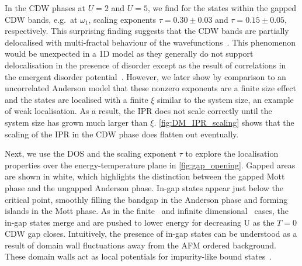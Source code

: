 In the CDW phases at \(U=2\) and \(U=5\), we find for the states within the gapped CDW bands, e.g.~at \(\omega_1\), scaling exponents \(\tau = 0.30\pm0.03\) and \(\tau = 0.15\pm0.05\), respectively. This surprising finding suggests that the CDW bands are partially delocalised with multi-fractal behaviour of the wavefunctions~\autocite{eversAndersonTransitions2008}. This phenomenon would be unexpected in a 1D model as they generally do not support delocalisation in the presence of disorder except as the result of correlations in the emergent disorder potential~\autocite{croyAndersonLocalization1D2011,goldshteinPurePointSpectrum1977}. However, we later show by comparison to an uncorrelated Anderson model that these nonzero exponents are a finite size effect and the states are localised with a finite \(\xi\) similar to the system size, an example of weak localisation. As a result, the IPR does not scale correctly until the system size has grown much larger than \(\xi\). \cref{fig:DM_IPR_scaling} shows that the scaling of the IPR in the CDW phase does flatten out eventually.

Next, we use the DOS and the scaling exponent \(\tau\) to explore the localisation properties over the energy-temperature plane in \cref{fig:gap_opening}. Gapped areas are shown in white, which highlights the distinction between the gapped Mott phase and the ungapped Anderson phase. In-gap states appear just below the critical point, smoothly filling the bandgap in the Anderson phase and forming islands in the Mott phase. As in the finite~\autocite{zondaGaplessRegimeCharge2019} and infinite dimensional~\autocite{hassanSpectralPropertiesChargedensitywave2007} cases, the in-gap states merge and are pushed to lower energy for decreasing U as the \(T=0\) CDW gap closes. Intuitively, the presence of in-gap states can be understood as a result of domain wall fluctuations away from the AFM ordered background. These domain walls act as local potentials for impurity-like bound states~\autocite{zondaGaplessRegimeCharge2019}.

